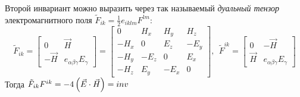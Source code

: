     Второй инвариант можно выразить через так называемый \textit{дуальный тензор} электромагнитного поля
    $\tilde{F}_{ik} = \frac 12 e_{iklm}F^{lm}$:
    \[
        \tilde{F}_{ik} = \begin{bmatrix}
            0 & \vec{H} \\
            -\vec{H} & e_{\alpha\beta\gamma}E_{\gamma}
        \end{bmatrix} = \begin{bmatrix}
            0 & H_x & H_y & H_z \\
            -H_x & 0 & E_z & -E_y \\
            -H_y & -E_z & 0 & E_x \\
            -H_z & E_y & -E_x & 0
        \end{bmatrix}, \:\: \tilde{F}^{ik} = \begin{bmatrix}
            0 & -\vec{H} \\
            \vec{H} & e_{\alpha\beta\gamma}E_{\gamma}
        \end{bmatrix}
    \]
    Тогда $\tilde{F}_{ik}F^{ik} = -4\left({\vec{E}\cdot\vec{H}}\right) = inv$
    
